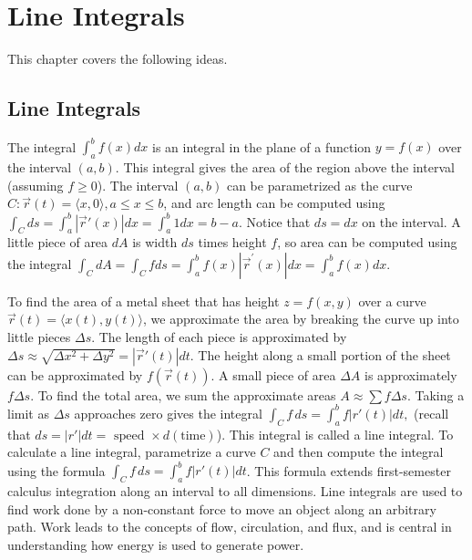 
\chapter{Line Integrals}

This chapter covers the following ideas. 


\section{Line Integrals}

The integral $\int_a^b f(x)dx$ is an integral in the plane of a function
$y=f(x)$ over the interval $(a,b)$.  This integral gives the area of
the region above the interval (assuming $f\geq 0$).  The interval $(a,b)$
can be parametrized as the curve $C\colon\vec r(t)= \langle x,0\rangle, a\leq x\leq
b$, and arc length can be computed using $\int_C ds = \int_a^b |\vec
r'(x)|dx = \int_a^b 1 dx = b-a$. Notice that $ds=dx$ on the interval. A
little piece of area $dA$ is width $ds$ times height $f$, so area can
be computed using the integral $\int_C dA = \int_C f ds = \int_a^b f(x)|\vec
r^\prime(x)|dx = \int_a^b f(x) dx$. 

To find the area of a metal sheet that has height $z=f(x,y) $ over a
curve $ \vec r(t)=\langle x(t),y(t)\rangle $, we approximate the area by breaking
the curve up into little pieces $\Delta s$. The length of each piece is
approximated by {$ \Delta s \approx \sqrt{\Delta x^2 +\Delta y^2} =|\vec r'(t)|dt$}. The
height along a small portion of the sheet can be approximated by
$f(\vec r(t))$. A small piece of area $\Delta A$ is approximately $f\Delta s
$. To find the total area, we sum the approximate areas $A\approx \sum f\Delta s$.
Taking a limit as $\Delta s$ approaches zero gives the integral $ \int_C f \,ds
= \int_a^b f |r'(t)|dt,$ (recall that $ds = |r'| dt = \text{ speed } \times
d(\text{time})$).  This integral is called a line integral.  To
calculate a line integral, parametrize a curve $C$ and then compute
the integral using the formula $ \int_C f\,ds = \int_a^b f |r'(t)|dt $. This
formula extends first-semester calculus integration along an interval
to all dimensions.  Line integrals are used to find work done by a
non-constant force to move an object along an arbitrary path. Work
leads to the concepts of flow, circulation, and flux, and is central
in understanding how energy is used to generate power.


